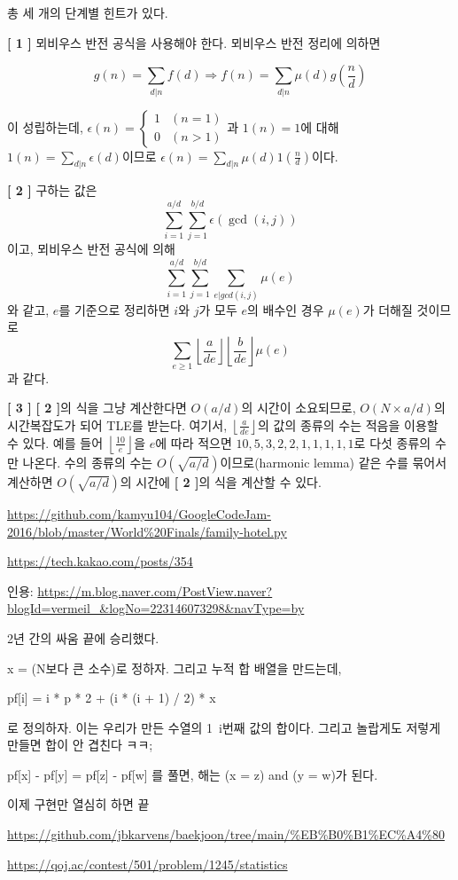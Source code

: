 \begin{hint}
    총 세 개의 단계별 힌트가 있다.

    \textbf{[ 1 ]} \newline
    뫼비우스 반전 공식을 사용해야 한다. 뫼비우스 반전 정리에 의하면

    $$g(n) = \sum_{d|n} f(d) \Rightarrow f(n) = \sum_{d|n} \mu(d) g\left( \frac{n}{d} \right)$$

    이 성립하는데, $\epsilon(n) = \begin{cases} 1 & (n=1) \\ 0 & (n>1) \end{cases}$과 $1(n) = 1$에 대해 $1(n) = \sum_{d|n} \epsilon(d)$이므로 $\epsilon(n) = \sum_{d|n} \mu(d) 1\left( \frac{n}{d} \right)$이다.

    \textbf{[ 2 ]} \newline
    구하는 값은 
    $$\sum_{i=1}^{a/d} \sum_{j=1}^{b/d} \epsilon(\gcd(i, j))$$
    이고, 뫼비우스 반전 공식에 의해
    $$\sum_{i=1}^{a/d} \sum_{j=1}^{b/d} \sum_{e|gcd(i, j)} \mu(e)$$
    와 같고, $e$를 기준으로 정리하면 $i$와 $j$가 모두 $e$의 배수인 경우 $\mu(e)$가 더해질 것이므로
    $$\sum_{e \geq 1} \left\lfloor \frac{a}{de} \right\rfloor \left\lfloor \frac{b}{de} \right\rfloor \mu(e)$$
    과 같다.

    \textbf{[ 3 ]} \newline
    \textbf{[ 2 ]}의 식을 그냥 계산한다면 $O(a/d)$의 시간이 소요되므로, $O(N \times a/d)$의 시간복잡도가 되어 TLE를 받는다. 여기서, $\left\lfloor \frac{a}{de} \right\rfloor$의 값의 종류의 수는 적음을 이용할 수 있다. 예를 들어 $\left\lfloor \frac{10}{e} \right\rfloor$을 $e$에 따라 적으면 $10, 5, 3, 2, 2, 1, 1, 1, 1, 1$로 다섯 종류의 수만 나온다. 수의 종류의 수는 $O(\sqrt{a/d})$이므로(harmonic lemma) 같은 수를 묶어서 계산하면 $O(\sqrt{a/d})$의 시간에 \textbf{[ 2 ]}의 식을 계산할 수 있다.
\end{hint}

\begin{hint}
    \url{https://github.com/kamyu104/GoogleCodeJam-2016/blob/master/World%20Finals/family-hotel.py}
\end{hint}

\begin{hint}
    \url{https://tech.kakao.com/posts/354}
\end{hint}

\begin{hint}
    인용: \url{https://m.blog.naver.com/PostView.naver?blogId=vermeil_&logNo=223146073298&navType=by}

    2년 간의 싸움 끝에 승리했다.

    x = (N보다 큰 소수)로 정하자. 그리고 누적 합 배열을 만드는데,

    pf[i] = i * p * 2 + (i * (i + 1) / 2) * x %

    로 정의하자. 이는 우리가 만든 수열의 1~i번째 값의 합이다. 그리고 놀랍게도 저렇게 만들면 합이 안 겹친다 ㅋㅋ;

    pf[x] - pf[y] = pf[z] - pf[w] 를 풀면, 해는 (x = z) and (y = w)가 된다.

    이제 구현만 열심히 하면 끝

    \url{https://github.com/jbkarvens/baekjoon/tree/main/%EB%B0%B1%EC%A4%80}
\end{hint}

\begin{hint}
    \url{https://qoj.ac/contest/501/problem/1245/statistics}
\end{hint}
